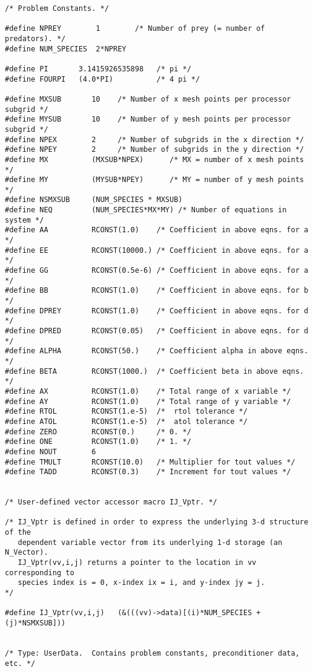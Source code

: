 \begin{verbatim}
/* Problem Constants. */

#define NPREY        1        /* Number of prey (= number of predators). */
#define NUM_SPECIES  2*NPREY

#define PI       3.1415926535898   /* pi */ 
#define FOURPI   (4.0*PI)          /* 4 pi */

#define MXSUB       10    /* Number of x mesh points per processor subgrid */
#define MYSUB       10    /* Number of y mesh points per processor subgrid */
#define NPEX        2     /* Number of subgrids in the x direction */
#define NPEY        2     /* Number of subgrids in the y direction */
#define MX          (MXSUB*NPEX)      /* MX = number of x mesh points */
#define MY          (MYSUB*NPEY)      /* MY = number of y mesh points */
#define NSMXSUB     (NUM_SPECIES * MXSUB)
#define NEQ         (NUM_SPECIES*MX*MY) /* Number of equations in system */
#define AA          RCONST(1.0)    /* Coefficient in above eqns. for a */
#define EE          RCONST(10000.) /* Coefficient in above eqns. for a */
#define GG          RCONST(0.5e-6) /* Coefficient in above eqns. for a */
#define BB          RCONST(1.0)    /* Coefficient in above eqns. for b */
#define DPREY       RCONST(1.0)    /* Coefficient in above eqns. for d */
#define DPRED       RCONST(0.05)   /* Coefficient in above eqns. for d */
#define ALPHA       RCONST(50.)    /* Coefficient alpha in above eqns. */
#define BETA        RCONST(1000.)  /* Coefficient beta in above eqns. */
#define AX          RCONST(1.0)    /* Total range of x variable */
#define AY          RCONST(1.0)    /* Total range of y variable */
#define RTOL        RCONST(1.e-5)  /*  rtol tolerance */
#define ATOL        RCONST(1.e-5)  /*  atol tolerance */
#define ZERO        RCONST(0.)     /* 0. */
#define ONE         RCONST(1.0)    /* 1. */
#define NOUT        6  
#define TMULT       RCONST(10.0)   /* Multiplier for tout values */
#define TADD        RCONST(0.3)    /* Increment for tout values */


/* User-defined vector accessor macro IJ_Vptr. */

/* IJ_Vptr is defined in order to express the underlying 3-d structure of the 
   dependent variable vector from its underlying 1-d storage (an N_Vector).
   IJ_Vptr(vv,i,j) returns a pointer to the location in vv corresponding to 
   species index is = 0, x-index ix = i, and y-index jy = j.                */

#define IJ_Vptr(vv,i,j)   (&(((vv)->data)[(i)*NUM_SPECIES + (j)*NSMXSUB]))


/* Type: UserData.  Contains problem constants, preconditioner data, etc. */


\end{verbatim}
